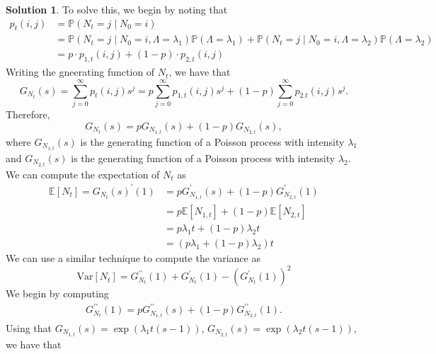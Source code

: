 \documentclass[12pt]{article}
\newcommand{\Prob}{\mathbb{P}}
\newcommand{\Expect}{\mathbb{E}}
\newcommand{\Var}{\text{Var}}
\theoremstyle{definition}
\newtheorem{sol}{Solution}
\theoremstyle{remark}
\begin{document}
\begin{sol}
    To solve this, we begin by noting that
    \begin{align*}
        p_{t}(i,j)  &= \Prob(N_{t} = j \mid N_{0} = i)\\
                    &= \Prob(N_{t} = j \mid N_{0} = i, \Lambda = \lambda_{1}) \Prob( \Lambda = \lambda_{1}) +  \Prob(N_{t} = j \mid N_{0} = i, \Lambda = \lambda_{2}) \Prob( \Lambda = \lambda_{2})\\
                    &= p \cdot p_{1,t}(i,j)+ (1-p) \cdot p_{2,t}(i,j)
    \end{align*}
    Writing the gneerating function of $N_{t}$, we have that
    \begin{equation*}
        G_{N_{t}}(s) = \sum_{j=0}^{\infty } p_{t}(i,j)s^{j} = p \sum_{j=0}^{\infty } p_{1,t}(i,j)s^{j} + (1-p)\sum_{j=0}^{\infty } p_{2.t}(i,j)s^{j}. 
    \end{equation*}
    Therefore, 
    \begin{equation*}
        G_{N_{t}}(s) = p G_{N_{1,t}}(s) + (1-p) G_{N_{2,t}}(s),
    \end{equation*}
    where $G_{N_{1,t}}(s)$ is the generating function of a Poisson process with intensity  $\lambda_{1}$ and $G_{N_{2,t}}(s)$ is the generating function of a Poisson process with intensity  $\lambda_{2}$. We can compute the expectation of $N_{t}$ as 
    \begin{align*}
        \Expect[N_{t}] = G_{N_{t}}(s)^{\prime}(1) 
        &= p G_{N_{1,t}}^{\prime}(s) + (1-p) G_{N_{2,t}}^{\prime}(1)\\
        &= p \Expect[N_{1,t}] + (1-p) \Expect[N_{2,t}] \\
        &= p \lambda_{1} t + (1-p) \lambda_{2}t\\
        &= (p\lambda_{1} + (1-p) \lambda_{2})t
    \end{align*}
    We can use a similar technique to compute the variance as
    \begin{equation*}
        \Var[N_{t}] = G_{N_{t}}^{\prime \prime}(1) + G_{N_{t}}^{\prime}(1) - ( G_{N_{t}}^{\prime}(1) )^{2}
    \end{equation*}
    We begin by computing
    \begin{align*}
    G_{N_{t}}^{\prime \prime}(1) = p G_{N_{1,t}}^{\prime\prime}(s) + (1-p) G_{N_{2,t}}^{\prime\prime}(1).
    \end{align*}
    Using that $G_{N_{1,t}}(s) = \exp(\lambda_{1}t (s-1))$, $G_{N_{2,t}}(s) = \exp(\lambda_{2}t(s-1))$, we have that
    \begin{equation*}

\end{equation*}
\end{sol}
\end{document}
